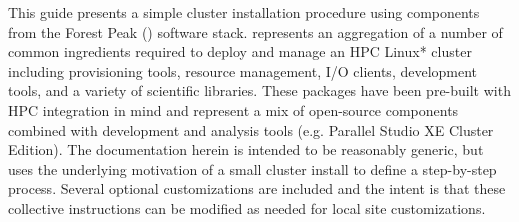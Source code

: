 This guide presents a simple cluster installation procedure using components
from the Forest Peak (\FSP{}) software stack. \FSP{} represents an aggregation of a number of
common ingredients required to deploy and manage an HPC Linux* cluster including
provisioning tools, resource management, I/O clients, development tools, and a variety of
scientific libraries. These packages have been pre-built with HPC integration
in mind and represent a mix of open-source components combined with \Intel{}
development and analysis tools (e.g. \Intel{} Parallel Studio XE Cluster Edition).
The documentation herein is intended to be reasonably generic, but uses the
underlying motivation of a small cluster install to define a step-by-step
process. Several optional customizations are included and the intent is that
these collective instructions can be modified as needed for local site
customizations. 
